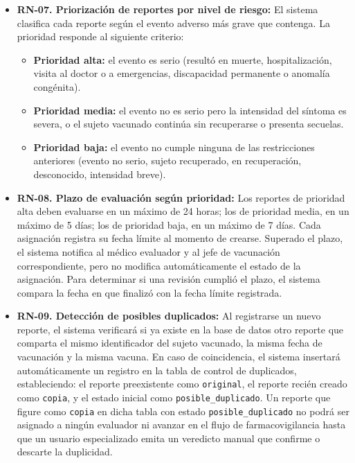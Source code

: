 \documentclass[12pt,letterpaper]{article}
\begin{document}
\begin{itemize}
\item \textbf{RN-07. Priorización de reportes por nivel de riesgo:} El sistema clasifica cada reporte según el evento adverso más grave que contenga. La prioridad responde al siguiente criterio:
\begin{itemize}
\item \textbf{Prioridad alta:} el evento es serio (resultó en muerte, hospitalización, visita al doctor o a emergencias, discapacidad permanente o anomalía congénita).
\item \textbf{Prioridad media:} el evento no es serio pero la intensidad del síntoma es severa, o el sujeto vacunado continúa sin recuperarse o presenta secuelas.
\item \textbf{Prioridad baja:} el evento no cumple ninguna de las restricciones anteriores (evento no serio, sujeto recuperado, en recuperación, desconocido, intensidad breve).
\end{itemize}

\item \textbf{RN-08. Plazo de evaluación según prioridad:} Los reportes de prioridad alta deben evaluarse en un máximo de 24 horas; los de prioridad media, en un máximo de 5 días; los de prioridad baja, en un máximo de 7 días. Cada asignación registra su fecha límite al momento de crearse. Superado el plazo, el sistema notifica al médico evaluador y al jefe de vacunación correspondiente, pero no modifica automáticamente el estado de la asignación. Para determinar si una revisión cumplió el plazo, el sistema compara la fecha en que finalizó con la fecha límite registrada.

\item \textbf{RN-09. Detección de posibles duplicados:} Al registrarse un nuevo reporte, el sistema verificará si ya existe en la base de datos otro reporte que comparta el mismo identificador del sujeto vacunado, la misma fecha de vacunación y la misma vacuna. En caso de coincidencia, el sistema insertará automáticamente un registro en la tabla de control de duplicados, estableciendo: el reporte preexistente como \texttt{original}, el reporte recién creado como \texttt{copia}, y el estado inicial como \texttt{posible\_duplicado}. Un reporte que figure como \texttt{copia} en dicha tabla con estado \texttt{posible\_duplicado} no podrá ser asignado a ningún evaluador ni avanzar en el flujo de farmacovigilancia hasta que un usuario especializado emita un veredicto manual que confirme o descarte la duplicidad.
\end{itemize}
\end{document}
